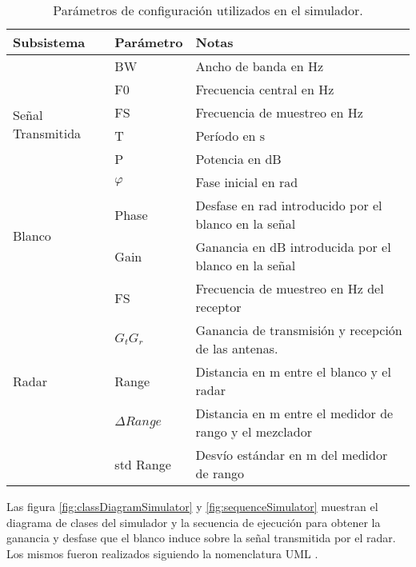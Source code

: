 \begin{table}[htb]
  \caption{Parámetros de configuración utilizados en el simulador.}
  \centering
  \label{tab:simulatorParameters}
  \begin{tabular}{l l l}
  \toprule
  \textbf{Subsistema} & \textbf{Parámetro} & \textbf{Notas} \tabularnewline
  \midrule
  \multirow{6}{2cm}{Señal Transmitida} & BW & Ancho de banda en $\si{\hertz}$ \tabularnewline

   & F0 & Frecuencia central en $\si{\hertz}$ \tabularnewline

   & FS & Frecuencia de muestreo en $\si{\hertz}$ \tabularnewline

   & T & Período en $\si{\second}$ \tabularnewline

   & P & Potencia en $\si{\deci\bel}$ \tabularnewline

   & $\varphi$ & Fase inicial en $\si{\radian}$ \tabularnewline
  \cmidrule{2-3}
  \multirow{2}{*}{Blanco} & Phase & Desfase en $\si{\radian}$ introducido por el blanco en la señal \tabularnewline

   & Gain & Ganancia en $\si{\deci\bel}$ introducida por el blanco en la señal \tabularnewline
  \cmidrule{2-3}
  \multirow{5}{*}{Radar} & FS & Frecuencia de muestreo en $\si{\hertz}$ del receptor \tabularnewline

   & $G_tG_r$ & Ganancia de transmisión y recepción de las antenas. \tabularnewline

   & Range & Distancia en $\si{\meter}$ entre el blanco y el radar \tabularnewline

   & $\Delta Range$ & Distancia en $\si{\meter}$ entre el medidor de rango y el mezclador \tabularnewline

   & std Range & Desvío estándar en $\si{\meter}$ del medidor de rango \tabularnewline
  \bottomrule 
  \end{tabular}
\end{table}

Las figura \ref{fig:classDiagramSimulator} y \ref{fig:sequenceSimulator} muestran el diagrama de clases del simulador y la secuencia de ejecución para obtener la ganancia y desfase que el blanco induce sobre la señal transmitida por el radar. Los mismos fueron realizados siguiendo la nomenclatura UML \cite{uml2.5}.

